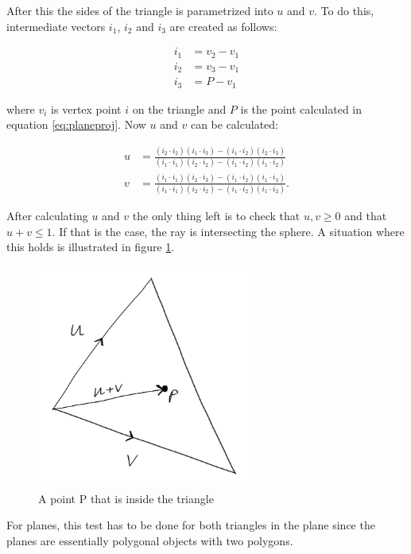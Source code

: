 \documentclass[a4paper]{report}
\begin{document}
After this the sides of the triangle is parametrized into \(u\) and
\(v\). To do this, intermediate vectors \(i_1\), \(i_2\) and \(i_3\)
are created as follows:

\begin{align}
  i_1 &= v_2 - v_1 \nonumber \\
  i_2 &= v_3 - v_1 \nonumber \\
  i_3 &= P - v_1
  \label{eq:intermediate}
\end{align}

where \(v_i\) is vertex point \(i\) on the triangle and \(P\) is the point calculated
in equation \ref{eq:planeproj}. Now \(u\) and \(v\) can be calculated:

\begin{align}
  u &= \frac{(i_2 \cdot i_2)(i_1 \cdot i_3) - (i_1 \cdot i_2)(i_2
    \cdot i_3)}{(i_1 \cdot i_1)(i_2 \cdot i_2) - (i_1 \cdot i_2)(i_1
    \cdot i_2)} \nonumber \\
  v &= \frac{(i_1 \cdot i_1)(i_2 \cdot i_3) - (i_1 \cdot i_2)(i_1
    \cdot i_3)}{(i_1 \cdot i_1)(i_2 \cdot i_2) - (i_1 \cdot i_2)(i_1
    \cdot i_2)}.
  \label{eq:uandv}
\end{align}

After calculating \(u\) and \(v\) the only thing left is to check that
\(u,v \geq 0\) and that \(u+v \leq 1\). If that is the case, the ray
is intersecting the sphere. A situation where this holds is
illustrated in figure \ref{fig:pointintriangle}.

\begin{figure}[h]
  \centering
  \includegraphics[width=7cm]{figures/3}
  \caption{A point P that is inside the triangle}
  \label{fig:pointintriangle}
\end{figure}

For planes, this test has to be done for both triangles in the plane
since the planes are essentially polygonal objects with two polygons.
\end{document}
